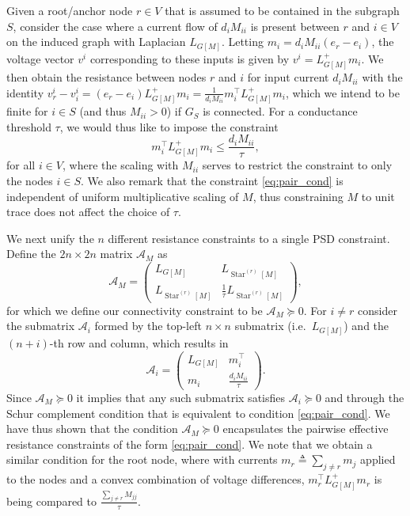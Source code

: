 \documentclass{article}
\DeclareMathOperator{\Star}{Star}
\begin{document}
Given a root/anchor node $r \in V$ that is assumed to be contained in the subgraph $S$, consider the case where a current flow of $d_i M_{ii}$ is present between $r$ and $i \in V$ on the induced graph with Laplacian $L_{G[M]}$. Letting $m_i = d_i M_{ii} (e_r - e_i)$, the voltage vector $v^i$ corresponding to these inputs is given by $v^i = L_{G[M]}^+ m_i$. We then obtain the resistance between nodes $r$ and $i$ for input current $d_i M_{ii}$ with the identity $v^i_r - v^i_i = (e_r - e_i) L_{G[M]}^+ m_i = \frac{1}{d_i M_{ii}} m_i^\top L_{G[M]}^+ m_i$, which we intend to be finite for $i \in S$ (and thus $M_{ii} > 0$) if $G_S$ is connected. For a conductance threshold $\tau$, we would thus like to impose the constraint
\begin{equation}
  m_i^\top L_{G[M]}^+ m_i \leq \frac{d_i M_{ii}}{\tau},
  \label{eq:pair_cond}
\end{equation}
for all $i \in V$, where the scaling with $M_{ii}$ serves to restrict the constraint to only the nodes $i \in S$. We also remark that the constraint \eqref{eq:pair_cond} is independent of uniform multiplicative scaling of $M$, thus constraining $M$ to unit trace does not affect the choice of $\tau$.

We next unify the $n$ different resistance constraints to a single PSD constraint.
Define the $2n \times 2n$ matrix $\mathcal{A}_M$ as
\[ \mathcal{A}_M = \begin{pmatrix} L_{G[M]} & L_{\Star^{(r)}[M]} \\ L_{\Star^{(r)}[M]} & \frac{1}{\tau} L_{\Star^{(r)}[M]} \end{pmatrix}, \]
for which we define our connectivity constraint to be $\mathcal{A}_M \succeq 0$. For $i \neq r$ consider the submatrix $\mathcal{A}_i$ formed by the top-left $n \times n$ submatrix (i.e.\ $L_{G[M]}$) and the $(n+i)$-th row and column, which results in
\[ \mathcal{A}_i = \begin{pmatrix} L_{G[M]} & m_i^\top \\ m_i & \frac{d_i M_{ii}}{\tau} \end{pmatrix}. \]
Since $\mathcal{A}_M \succeq 0$ it implies that any such submatrix satisfies $\mathcal{A}_i \succeq 0$ and through the Schur complement condition that is equivalent to condition \eqref{eq:pair_cond}. We have thus shown that the condition $\mathcal{A}_M \succeq 0$ encapsulates the pairwise effective resistance constraints of the form \eqref{eq:pair_cond}. We note that we obtain a similar condition for the root node, where with currents $m_r \triangleq \sum_{j \neq r} m_j$ applied to the nodes and a convex combination of voltage differences, $m_r^\top L_{G[M]}^+ m_r$ is being compared to $\frac{\sum_{j \neq r} M_{jj}}{\tau}$.
\end{document}
